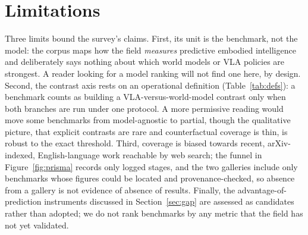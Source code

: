 \section{Limitations}
\label{sec:limitations}

Three limits bound the survey's claims. First, its unit is the benchmark, not the model: the corpus
maps how the field \emph{measures} predictive embodied intelligence and deliberately says nothing
about which world models or VLA policies are strongest. A reader looking for a model ranking will not
find one here, by design. Second, the contrast axis rests on an operational definition
(Table~\ref{tab:defs}): a benchmark counts as building a VLA-versus-world-model contrast only when
both branches are run under one protocol. A more permissive reading would move some benchmarks from
model-agnostic to partial, though the qualitative picture, that explicit contrasts are rare and
counterfactual coverage is thin, is robust to the exact threshold. Third, coverage is biased towards
recent, arXiv-indexed, English-language work reachable by web search; the funnel in
Figure~\ref{fig:prisma} records only logged stages, and the two galleries include only benchmarks
whose figures could be located and provenance-checked, so absence from a gallery is not evidence of
absence of results. Finally, the advantage-of-prediction instruments discussed in
Section~\ref{sec:gap} are assessed as candidates rather than adopted; we do not rank benchmarks by any
metric that the field has not yet validated.
